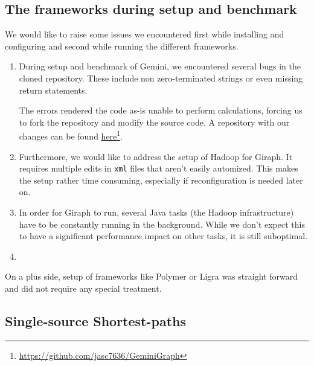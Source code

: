 

\subsection{The frameworks during setup and benchmark}
We would like to raise some issues we encountered first while installing and configuring and second while running the different frameworks.

\begin{enumerate}
	\item During setup and benchmark of Gemini, we encountered several bugs in the cloned repository. These include non zero-terminated strings or even missing return statements.

	The errors rendered the code as-is unable to perform calculations, forcing us to fork the repository and modify the source code. A repository with our changes can be found \href{https://github.com/jasc7636/GeminiGraph}{here}\footnote{\url{https://github.com/jasc7636/GeminiGraph}}.

	\item Furthermore, we would like to address the setup of Hadoop for Giraph. It requires multiple edits in \texttt{xml} files that aren't easily automized. This makes the setup rather time consuming, especially if reconfiguration is needed later on.
	\item In order for Giraph to run, several Java tasks (the Hadoop infrastructure) have to be constantly running in the background. While we don't expect this to have a significant performance impact on other tasks, it is still suboptimal.

	\item 
\end{enumerate}


On a plus side, setup of frameworks like Polymer or Ligra was straight forward and did not require any special treatment. 


\subsection{Single-source Shortest-paths}

